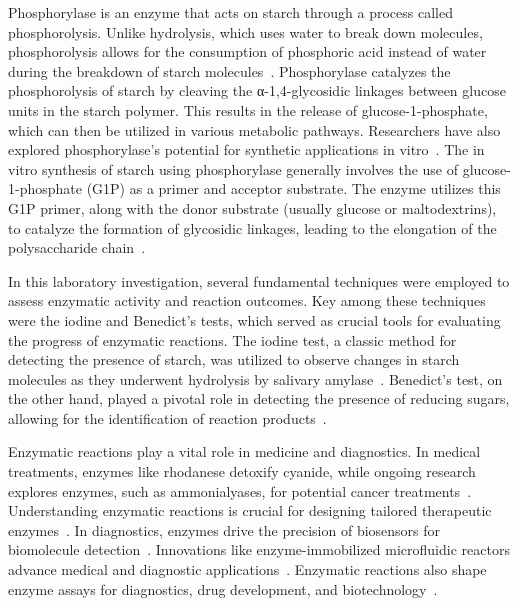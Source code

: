 \documentclass[12pt]{article}
\begin{document}
        Phosphorylase is an enzyme that acts on starch through a process called phosphorolysis. 
        Unlike hydrolysis, which uses water to break down molecules, phosphorolysis allows for the consumption of phosphoric acid instead of water during the breakdown of starch molecules~\parencite{Mandel2010}. 
        Phosphorylase catalyzes the phosphorolysis of starch by cleaving the α-1,4-glycosidic linkages between glucose units in the starch polymer. 
        This results in the release of glucose-1-phosphate, which can then be utilized in various metabolic pathways. 
        Researchers have also explored phosphorylase's potential for synthetic applications in vitro~\parencite{Rathore2009}. 
        The in vitro synthesis of starch using phosphorylase generally involves the use of glucose-1-phosphate (G1P) as a primer and acceptor substrate. 
        The enzyme utilizes this G1P primer, along with the donor substrate (usually glucose or maltodextrins), to catalyze the formation of glycosidic linkages, leading to the elongation of the polysaccharide chain~\parencite{Cuesta2017}.

        In this laboratory investigation, several fundamental techniques were employed to assess enzymatic activity and reaction outcomes. 
        Key among these techniques were the iodine and Benedict's tests, which served as crucial tools for evaluating the progress of enzymatic reactions. 
        The iodine test, a classic method for detecting the presence of starch, was utilized to observe changes in starch molecules as they underwent hydrolysis by salivary amylase~\parencite{Wang2019}. 
        Benedict's test, on the other hand, played a pivotal role in detecting the presence of reducing sugars, allowing for the identification of reaction products~\parencite{Fleischer2019}.

        Enzymatic reactions play a vital role in medicine and diagnostics. 
        In medical treatments, enzymes like rhodanese detoxify cyanide, while ongoing research explores enzymes, such as ammonialyases, for potential cancer treatments~\parencite{Tracewell2009, Parmeggiani2017}.
        Understanding enzymatic reactions is crucial for designing tailored therapeutic enzymes~\parencite{Frushicheva2014}. 
        In diagnostics, enzymes drive the precision of biosensors for biomolecule detection~\parencite{Asanomi2011}. 
        Innovations like enzyme-immobilized microfluidic reactors advance medical and diagnostic applications~\parencite{Asanomi2011}. 
        Enzymatic reactions also shape enzyme assays for diagnostics, drug development, and biotechnology~\parencite{Kim2016, Li2012}.
\end{document}
